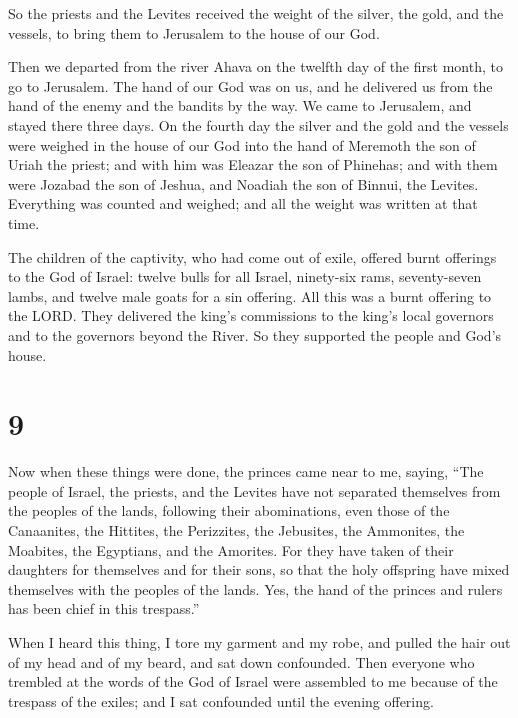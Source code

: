  So the priests and the Levites received the weight of
the silver, the gold, and the vessels, to bring them to Jerusalem to the
house of our God.

 Then we departed from the river Ahava on the twelfth day
of the first month, to go to Jerusalem. The hand of our God was on us,
and he delivered us from the hand of the enemy and the bandits by the
way.  We came to Jerusalem, and stayed there three days.
 On the fourth day the silver and the gold and the
vessels were weighed in the house of our God into the hand of Meremoth
the son of Uriah the priest; and with him was Eleazar the son of
Phinehas; and with them were Jozabad the son of Jeshua, and Noadiah the
son of Binnui, the Levites.  Everything was counted and
weighed; and all the weight was written at that time.

 The children of the captivity, who had come out of
exile, offered burnt offerings to the God of Israel: twelve bulls for
all Israel, ninety-six rams, seventy-seven lambs, and twelve male goats
for a sin offering. All this was a burnt offering to the LORD.
 They delivered the king's commissions to the king's
local governors and to the governors beyond the River. So they supported
the people and God's house.

\hypertarget{section-8}{%
\section{9}\label{section-8}}

 Now when these things were done, the princes came near to
me, saying, ``The people of Israel, the priests, and the Levites have
not separated themselves from the peoples of the lands, following their
abominations, even those of the Canaanites, the Hittites, the
Perizzites, the Jebusites, the Ammonites, the Moabites, the Egyptians,
and the Amorites.  For they have taken of their daughters
for themselves and for their sons, so that the holy offspring have mixed
themselves with the peoples of the lands. Yes, the hand of the princes
and rulers has been chief in this trespass.''

 When I heard this thing, I tore my garment and my robe,
and pulled the hair out of my head and of my beard, and sat down
confounded.  Then everyone who trembled at the words of
the God of Israel were assembled to me because of the trespass of the
exiles; and I sat confounded until the evening offering.

